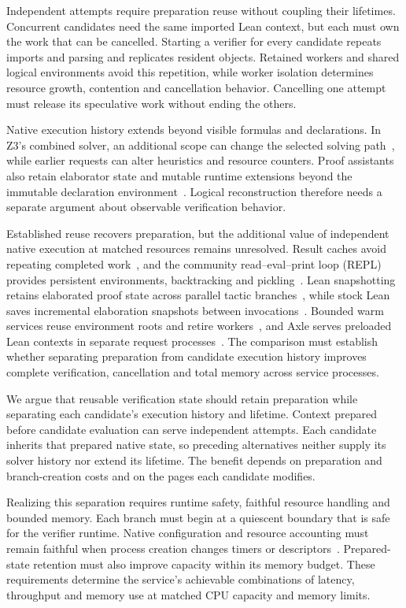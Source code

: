 \documentclass[10pt,twocolumn]{article}
\begin{document}
Independent attempts require preparation reuse without coupling their lifetimes. Concurrent candidates need the same imported Lean context, but each must own the work that can be cancelled. Starting a verifier for every candidate repeats imports and parsing and replicates resident objects. Retained workers and shared logical environments avoid this repetition, while worker isolation determines resource growth, contention and cancellation behavior. Cancelling one attempt must release its speculative work without ending the others.

Native execution history extends beyond visible formulas and declarations. In Z3's combined solver, an additional scope can change the selected solving path~\cite{z3api}, while earlier requests can alter heuristics and resource counters. Proof assistants also retain elaborator state and mutable runtime extensions beyond the immutable declaration environment~\cite{lean4,repl}. Logical reconstruction therefore needs a separate argument about observable verification behavior.

Established reuse recovers preparation, but the additional value of independent native execution at matched resources remains unresolved. Result caches avoid repeating completed work~\cite{boogieCache}, and the community read--eval--print loop (REPL) provides persistent environments, backtracking and pickling~\cite{repl}. Lean snapshotting retains elaborated proof state across parallel tactic branches~\cite{leanSnapshot}, while stock Lean saves incremental elaboration snapshots between invocations~\cite{leanIncremental}. Bounded warm services reuse environment roots and retire workers~\cite{kimina,kiminaPaper}, and Axle serves preloaded Lean contexts in separate request processes~\cite{axle}. The comparison must establish whether separating preparation from candidate execution history improves complete verification, cancellation and total memory across service processes.

We argue that reusable verification state should retain preparation while separating each candidate's execution history and lifetime. Context prepared before candidate evaluation can serve independent attempts. Each candidate inherits that prepared native state, so preceding alternatives neither supply its solver history nor extend its lifetime. The benefit depends on preparation and branch-creation costs and on the pages each candidate modifies.

Realizing this separation requires runtime safety, faithful resource handling and bounded memory. Each branch must begin at a quiescent boundary that is safe for the verifier runtime. Native configuration and resource accounting must remain faithful when process creation changes timers or descriptors~\cite{fork}. Prepared-state retention must also improve capacity within its memory budget. These requirements determine the service's achievable combinations of latency, throughput and memory use at matched CPU capacity and memory limits.
\end{document}
